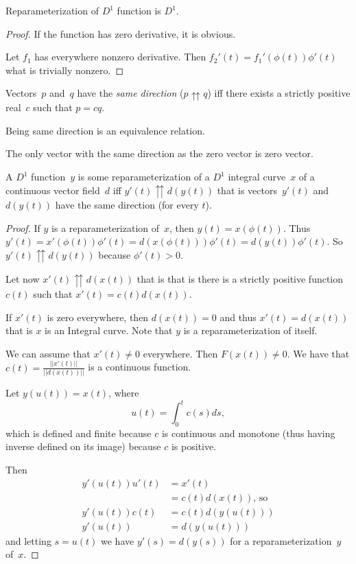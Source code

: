 \begin{prop}
Reparameterization of $D^1$ function is $D^1$.
\end{prop}

\begin{proof}
If the function has zero derivative, it is obvious.

Let $f_1$ has everywhere nonzero derivative. Then $f_2'(t) = f_1'(\phi(t))\phi'(t)$ what is trivially nonzero.
\end{proof}

\begin{defn}
Vectors~$p$ and~$q$ have the \emph{same direction} ($p\upuparrows q$) iff there exists a strictly positive real~$c$ such that $p=cq$.
\end{defn}

\begin{obvious}
Being same direction is an equivalence relation.
\end{obvious}

\begin{obvious}
The only vector with the same direction as the zero vector is zero vector.
\end{obvious}

\begin{thm}
A $D^1$ function~$y$ is some reparameterization of a $D^1$ integral curve~$x$ of a continuous vector field~$d$ iff
$y'(t)\upuparrows d(y(t))$ that is vectors~$y'(t)$ and $d(y(t))$ have the same direction (for every $t$).
\end{thm}

\begin{proof}
If $y$ is a reparameterization of~$x$, then $y(t)=x(\phi(t))$. Thus $y'(t)=x'(\phi(t))\phi'(t)=d(x(\phi(t)))\phi'(t)=d(y(t))\phi'(t)$.
So $y'(t)\upuparrows d(y(t))$ because $\phi'(t)>0$.

Let now $x'(t)\upuparrows d(x(t))$ that is that is there is a strictly positive function $c(t)$ such that
$x'(t) = c(t) d(x(t))$.

If $x'(t)$ is zero everywhere, then $d(x(t))=0$ and thus $x'(t)=d(x(t))$ that is $x$ is an Integral curve.
Note that $y$ is a reparameterization of itself.

We can assume that $x'(t)\ne 0$ everywhere. Then $F(x(t))\ne 0$. We have
that $c(t) = \frac{||x'(t)||}{||d(x(t))||}$ is a continuous function. 

Let $y(u(t)) = x(t)$, where \[ u(t)=\int_0^t c(s)ds, \]
which is defined and finite because $c$ is continuous and monotone (thus having inverse defined on its image)
because $c$ is positive.

Then
\begin{align*}
y'(u(t)) u'(t) &= x'(t) \\
&= c(t) d(x(t)) \text{, so}\\
y'(u(t)) c(t) &= c(t) d(y(u(t))) \\
y'(u(t))  &=  d(y(u(t)))
\end{align*}
and letting $s=u(t)$ we have $y'(s)=d(y(s))$ for a reparameterization~$y$ of~$x$.
\end{proof}

